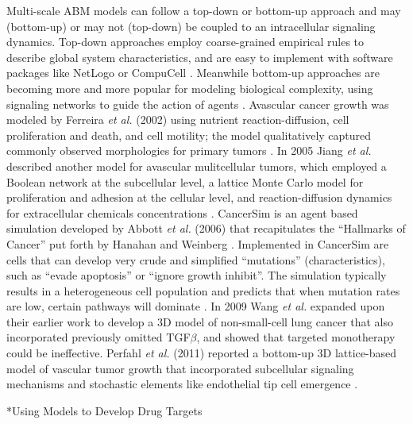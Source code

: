 \documentclass[12pt]{article}
\makeatletter
\renewcommand\subsection{\@startsection
	{subsection}{2}{0mm}
	{-0.05in}
	{-0.5\baselineskip}
	{\normalfont\normalsize\bfseries}}
\makeatother
\begin{document}
Multi-scale ABM models \cite{Kaul2013} can follow a top-down or bottom-up approach and may (bottom-up) or may not (top-down) be coupled to an intracellular signaling dynamics. Top-down approaches employ coarse-grained empirical rules to describe global system characteristics, and are easy to implement with software packages like NetLogo \cite{Sklar2007} or CompuCell \cite{Andasari2012}. Meanwhile bottom-up approaches are becoming more and more popular for modeling biological complexity, using signaling networks to guide the action of agents \cite{Chakrabarti2012}. Avascular cancer growth was modeled by Ferreira \textit{et al.} (2002) using nutrient reaction-diffusion, cell proliferation and death, and cell motility; the model qualitatively captured commonly observed morphologies for primary tumors \cite{Ferreira2002}. In 2005 Jiang \textit{et al.} described another model for avascular mulitcellular tumors, which employed a Boolean network at the subcellular level, a lattice Monte Carlo model for proliferation and adhesion at the cellular level, and reaction-diffusion dynamics for extracellular chemicals concentrations \cite{Jiang2005}. CancerSim is an agent based simulation developed by Abbott \textit{et al.} (2006) that recapitulates the \textquotedblleft Hallmarks of Cancer\textquotedblright \: put forth by Hanahan and Weinberg \cite{Abbott2006}. Implemented in CancerSim are cells that can develop very crude and simplified \textquotedblleft mutations\textquotedblright \: (characteristics), such as \textquotedblleft evade apoptosis\textquotedblright \: or \textquotedblleft ignore growth inhibit\textquotedblright. The simulation typically results in a heterogeneous cell population and predicts that when mutation rates are low, certain pathways will dominate \cite{Abbott2006}. In 2009 \cite{Wang2009} Wang \textit{et al.} expanded upon their earlier work \cite{Wang2009} to develop a 3D model of non-small-cell lung cancer that also incorporated previously omitted TGF$\beta$, and showed that targeted monotherapy could be ineffective. Perfahl \textit{et al.} (2011) reported a bottom-up 3D lattice-based model of vascular tumor growth that incorporated subcellular signaling mechanisms and stochastic elements like endothelial tip cell emergence \cite{Perfahl2011}. 


\subsection*{Using Models to Develop Drug Targets}
\end{document}
